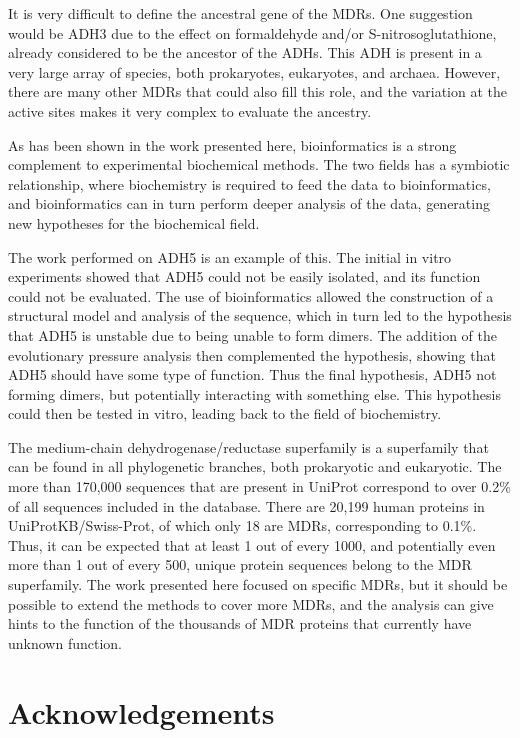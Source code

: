 \documentclass[a4paper, twoside, 12pt, openright]{report}
\begin{document}
It is very difficult to define the ancestral gene of the MDRs. One suggestion would be ADH3 due to the effect on formaldehyde and/or S-nitrosoglutathione, already considered to be the ancestor of the ADHs\cite{danielsson_enzymogenesis:_1992}\cite{hoog_mammalian_2001-1}. This ADH is present in a very large array of species, both prokaryotes, eukaryotes, and archaea. However, there are many other MDRs that could also fill this role, and the variation at the active sites makes it very complex to evaluate the ancestry.

As has been shown in the work presented here, bioinformatics is a strong complement to experimental biochemical methods. The two fields has a symbiotic relationship, where biochemistry is required to feed the data to bioinformatics, and bioinformatics can in turn perform deeper analysis of the data, generating new hypotheses for the biochemical field.

The work performed on ADH5 is an example of this. The initial in vitro experiments showed that ADH5 could not be easily isolated, and its function could not be evaluated. The use of bioinformatics allowed the construction of a structural model and analysis of the sequence, which in turn led to the hypothesis that ADH5 is unstable due to being unable to form dimers. The addition of the evolutionary pressure analysis then complemented the hypothesis, showing that ADH5 should have some type of function. Thus the final hypothesis, ADH5 not forming dimers, but potentially interacting with something else. This hypothesis could then be tested in vitro, leading back to the field of biochemistry.

The medium-chain dehydrogenase/reductase superfamily is a superfamily that can be found in all phylogenetic branches, both prokaryotic and eukaryotic. The more than 170,000 sequences that are present in UniProt correspond to over 0.2\% of all sequences included in the database. There are 20,199 human proteins in UniProtKB/Swiss-Prot, of which only 18 are MDRs, corresponding to 0.1\%. Thus, it can be expected that at least 1 out of every 1000, and potentially even more than 1 out of every 500, unique protein sequences belong to the MDR superfamily. The work presented here  focused on specific MDRs, but it should be possible to extend the methods to cover more MDRs, and the analysis can give hints to the function of the thousands of MDR proteins that currently have unknown function.


\chapter{Acknowledgements}
\label{sec:acknowledgements}
\end{document}
